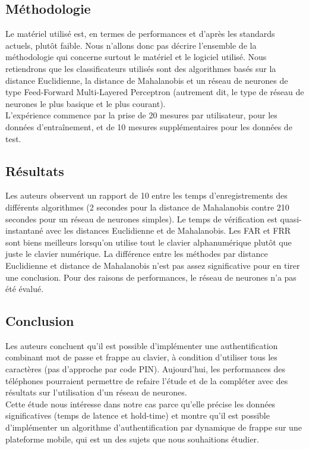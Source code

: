 \subsection{Méthodologie}

Le matériel utilisé est, en termes de performances et d'après les standards actuels, plutôt faible. Nous n'allons donc pas décrire l'ensemble de la méthodologie qui concerne surtout le matériel et le logiciel utilisé. Nous retiendrons que les classificateurs utilisés sont des algorithmes basés sur la distance Euclidienne, la distance de Mahalanobis et un réseau de neurones de type Feed-Forward Multi-Layered Perceptron (autrement dit, le type de réseau de neurones le plus basique et le plus courant).\\

L'expérience commence par la prise de 20 mesures par utilisateur, pour les données d'entraînement, et de 10 mesures supplémentaires pour les données de test.

\subsection{Résultats}

Les auteurs observent un rapport de 10 entre les temps d'enregistrements des différents algorithmes (2 secondes pour la distance de Mahalanobis contre 210 secondes pour un réseau de neurones simples). Le temps de vérification est quasi-instantané avec les distances Euclidienne et de Mahalanobis. Les FAR et FRR sont biens meilleurs lorsqu'on utilise tout le clavier alphanumérique plutôt que juste le clavier numérique. La différence entre les méthodes par distance Euclidienne et distance de Mahalanobis n'est pas assez significative pour en tirer une conclusion. Pour des raisons de performances, le réseau de neurones n'a pas été évalué.

\subsection{Conclusion}

Les auteurs concluent qu'il est possible d'implémenter une authentification combinant mot de passe et frappe au clavier, à condition d'utiliser tous les caractères (pas d'approche par code PIN). Aujourd'hui, les performances des téléphones pourraient permettre de refaire l'étude et de la compléter avec des résultats sur l'utilisation d'un réseau de neurones.\\

Cette étude nous intéresse dans notre cas parce qu'elle précise les données significatives (temps de latence et hold-time) et montre qu'il est possible d'implémenter un algorithme d'authentification par dynamique de frappe sur une plateforme mobile, qui est un des sujets que nous souhaitions étudier.
